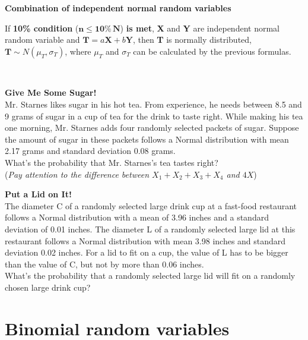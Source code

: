 \documentclass[a4paper, 12pt,twoside]{book}
\begin{document}
    \newpage
\noindent\textbf{Combination of independent normal random variables}\vspace{0.3cm}\\
\colorbox{babypink}{\parbox{\textwidth}{
If \textbf{10\% condition} ($\mathbf{n \leq 10\%\,N}$) \textbf{is met}, \textbf{X} and \textbf{Y} are independent normal random variable and $\textbf{T} = a\textbf{X} + b\textbf{Y}$, then \textbf{T} is normally distributed, $\textbf{T} \sim N(\mu_T, \sigma_T)$, where $\mu _ T$ and $\sigma_T$ can be calculated by the previous formulas.
}}\vspace{1.6cm}\\
  \colorbox{champagne}{\parbox{\textwidth}{
  \textbf{Give Me Some Sugar!}\vspace{0.3cm}\\
  Mr. Starnes likes sugar in his hot tea. From experience, he needs between 8.5 and 9 grams of sugar in a cup of tea for the drink to taste right. While making his tea one morning, Mr. Starnes adds four randomly selected packets of sugar. Suppose the amount of sugar in these packets follows a Normal distribution with mean 2.17 grams and standard deviation 0.08 grams.\vspace{0.3cm}\\
  What’s the probability that Mr. Starnes’s tea tastes right?\\
  (\textit{Pay attention to the difference between $X_1 + X_2 + X_3 + X_4$ and $4X$})
  }}
  \newpage

  \colorbox{champagne}{\parbox{\textwidth}{
  \textbf{Put a Lid on It!}\vspace{0.3cm}\\
  The diameter C of a randomly selected large drink cup at a fast-food restaurant follows a Normal distribution with a mean of 3.96 inches and a standard deviation of 0.01 inches. The diameter L of a randomly selected large lid at this restaurant follows a Normal distribution with mean 3.98 inches and standard deviation 0.02 inches. For a lid to fit on a cup, the value of L has to be bigger than the value of C, but not by more than 0.06 inches.\vspace{0.3cm}\\
   What’s the probability that a randomly selected large lid will fit on a randomly chosen large drink cup?   
  }}
  \newpage
  
  \section{\large{Binomial random variables}}
\end{document}
